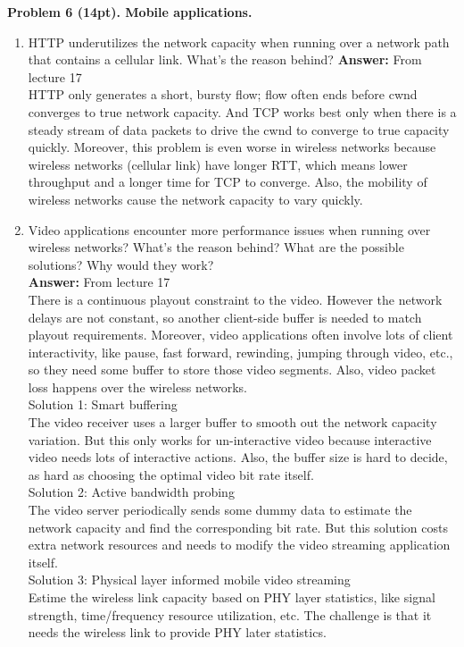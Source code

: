 \documentclass[12pt]{article}
\begin{document}
\noindent \textbf{Problem 6 (14pt). Mobile applications.\\}
\begin{enumerate}
\item HTTP underutilizes the network capacity when running over a network path that contains a cellular link. What’s the reason behind?
\textbf{Answer:} From lecture 17\\
HTTP only generates a short, bursty flow; flow often ends before cwnd converges to true network capacity. And TCP works best only when there is a steady stream of data packets to drive the cwnd to converge to true capacity quickly. Moreover, this problem is even worse in wireless networks because wireless networks (cellular link) have longer RTT, which means lower throughput and a longer time for TCP to converge. Also, the mobility of wireless networks cause the network capacity to vary quickly.
\item Video applications encounter more performance issues when running over wireless networks? What’s the reason behind? What are the possible solutions? Why would they work?\\
\textbf{Answer:} From lecture 17\\
There is a continuous playout constraint to the video. However the network delays are not constant, so another client-side buffer is needed to match playout requirements. Moreover, video applications often involve lots of client interactivity, like pause, fast forward, rewinding, jumping through video, etc., so they need some buffer to store those video segments. Also, video packet loss happens over the wireless networks.\\
Solution 1: Smart buffering\\
The video receiver uses a larger buffer to smooth out the network capacity variation. But this only works for un-interactive video because interactive video needs lots of interactive actions. Also, the buffer size is hard to decide, as hard as choosing the optimal video bit rate itself.\\
Solution 2: Active bandwidth probing\\
The video server periodically sends some dummy data to estimate the network capacity and find the corresponding bit rate. But this solution costs extra network resources and needs to modify the video streaming application itself.\\
Solution 3: Physical layer informed mobile video streaming\\
Estime the wireless link capacity based on PHY layer statistics, like signal strength, time/frequency resource utilization, etc. The challenge is that it needs the wireless link to provide PHY later statistics.
\end{enumerate}
\end{document}
